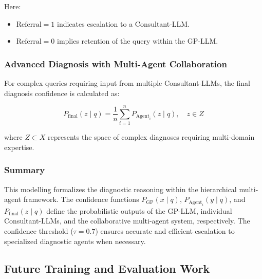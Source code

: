 \documentclass[letterpaper]{article} %
\begin{document}
Here:
\begin{itemize}
    \item \( \text{Referral} = 1 \) indicates escalation to a Consultant-LLM.
    \item \( \text{Referral} = 0 \) implies retention of the query within the GP-LLM.
\end{itemize}

\subsubsection{Advanced Diagnosis with Multi-Agent Collaboration}

For complex queries requiring input from multiple Consultant-LLMs, the final diagnosis confidence is calculated as:

\begin{equation}
P_{\text{final}}(z \mid q) = \frac{1}{n} \sum_{i=1}^n P_{\text{Agent}_i}(z \mid q), \quad z \in Z
\end{equation}

where \( Z \subset X \) represents the space of complex diagnoses requiring multi-domain expertise.
\subsubsection{Summary}
This modelling formalizes the diagnostic reasoning within the hierarchical multi-agent framework. The confidence functions \( P_{\text{GP}}(x \mid q) \), \( P_{\text{Agent}_i}(y \mid q) \), and \( P_{\text{final}}(z \mid q) \) define the probabilistic outputs of the GP-LLM, individual Consultant-LLMs, and the collaborative multi-agent system, respectively. The confidence threshold (\( \tau = 0.7 \)) ensures accurate and efficient escalation to specialized diagnostic agents when necessary.


\subsection{Future Training and Evaluation Work}
\end{document}
